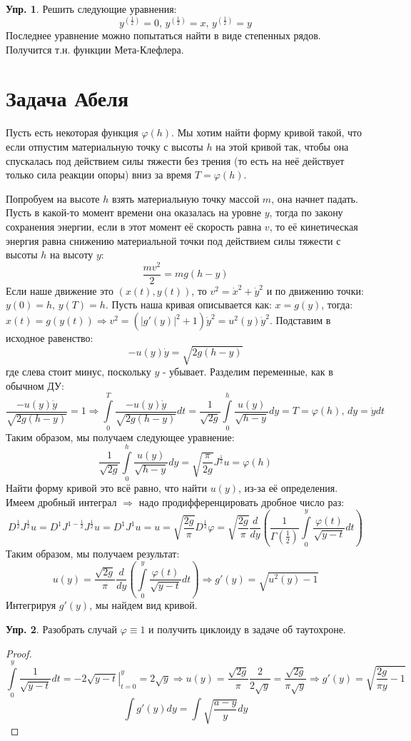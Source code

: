 \documentclass[12pt]{article}
\theoremstyle{definition}
\newtheorem{exrc}{Упр.}
\newcommand{\ddint}[2]{\displaystyle\int\limits_{#1}^{#2}}
\begin{document}
\begin{exrc}
	Решить следующие уравнения:
	$$
		y^{\left(\frac{1}{2}\right)} = 0, \, 
		y^{\left(\frac{1}{2}\right)} = x, \,	
		y^{\left(\frac{1}{2}\right)} = y
	$$
	Последнее уравнение можно попытаться найти в виде степенных рядов. Получится т.н. функции Мета-Клефлера.
\end{exrc}

\newpage
\section*{Задача Абеля}
Пусть есть некоторая функция $\varphi(h)$. Мы хотим найти форму кривой такой, что если отпустим материальную точку с высоты $h$ на этой кривой так, чтобы она спускалась под действием силы тяжести без трения (то есть на неё действует только сила реакции опоры) вниз за время $T = \varphi(h)$.

Попробуем на высоте $h$ взять материальную точку массой $m$, она начнет падать. Пусть в какой-то момент времени она оказалась на уровне $y$, тогда по закону сохранения энергии, если в этот момент её скорость равна $v$, то её кинетическая энергия равна снижению материальной точки под действием силы тяжести с высоты $h$ на высоту $y$:
$$
	\dfrac{mv^2}{2} = mg(h-y)
$$
Если наше движение это $(x(t),y(t))$, то $v^2 = \dot{x}^2 + \dot{y}^2$ и по движению точки: $ y(0) = h, \, y(T) = h$. Пусть наша кривая описывается как: $x = g(y)$, тогда: $x(t) = g(y(t)) \Rightarrow v^2 = \left(|g'(y)|^2 + 1\right)\dot{y}^2 = u^2(y)\dot{y}^2$. Подставим в исходное равенство:
$$
	-u(y)\dot{y} = \sqrt{2g(h-y)}
$$
где слева стоит минус, поскольку $y$ - убывает. Разделим переменные, как в обычном ДУ:
$$
	\dfrac{-u(y)\dot{y}}{\sqrt{2g(h - y)}} = 1  \Rightarrow \ddint{0}{T} \dfrac{-u(y)\dot{y}}{\sqrt{2g(h - y)}}dt = \dfrac{1}{\sqrt{2g}}\ddint{0}{h}\dfrac{u(y)}{\sqrt{h - y}}dy = T = \varphi(h), \, dy = \dot{y}dt
$$
Таким образом, мы получаем следующее уравнение:
$$
	\dfrac{1}{\sqrt{2g}}\ddint{0}{h}\dfrac{u(y)}{\sqrt{h - y}}dy = \sqrt{\dfrac{\pi}{2g}}J^{\frac{1}{2}}u = \varphi(h)
$$
Найти форму кривой это всё равно, что найти $u(y)$, из-за её определения. Имеем дробный интеграл $\Rightarrow$ надо продифференцировать дробное число раз:
$$
	D^{\frac{1}{2}}J^{\frac{1}{2}}u = D^{1}J^{1 - \frac{1}{2}}J^{\frac{1}{2}}u = D^{1}J^{1}u = u = \sqrt{\dfrac{2g}{\pi}}D^{\frac{1}{2}}\varphi = \sqrt{\dfrac{2g}{\pi}}\dfrac{d}{dy}\left(\dfrac{1}{\Gamma(\frac{1}{2})}\ddint{0}{y}\dfrac{\varphi(t)}{\sqrt{y -t}}dt\right)
$$
Таким образом, мы получаем результат:
$$
	u(y) = \dfrac{\sqrt{2g}}{\pi}\dfrac{d}{dy}\left(\ddint{0}{y}\dfrac{\varphi(t)}{\sqrt{y -t}}dt\right) \Rightarrow g'(y) = \sqrt{u^2(y) - 1}
$$
Интегрируя $g'(y)$, мы найдем вид кривой.
\begin{exrc}
	Разобрать случай $\varphi \equiv 1$ и получить циклоиду в задаче об таутохроне.
\end{exrc}
\begin{proof}
	$$
		\ddint{0}{y}\dfrac{1}{\sqrt{y -t}}dt =  -\left.2\sqrt{y-t}\right|_{t = 0}^{y} = 2\sqrt{y} \Rightarrow u(y) = \dfrac{\sqrt{2g}}{\pi}\dfrac{2}{2\sqrt{y}} = \dfrac{\sqrt{2g}}{\pi\sqrt{y}} \Rightarrow g'(y) = \sqrt{\dfrac{2g}{\pi y} - 1 }
	$$
	$$
		\int g'(y)dy = \int \sqrt{\dfrac{a - y}{y}}dy
	$$
\end{proof}
\end{document}
